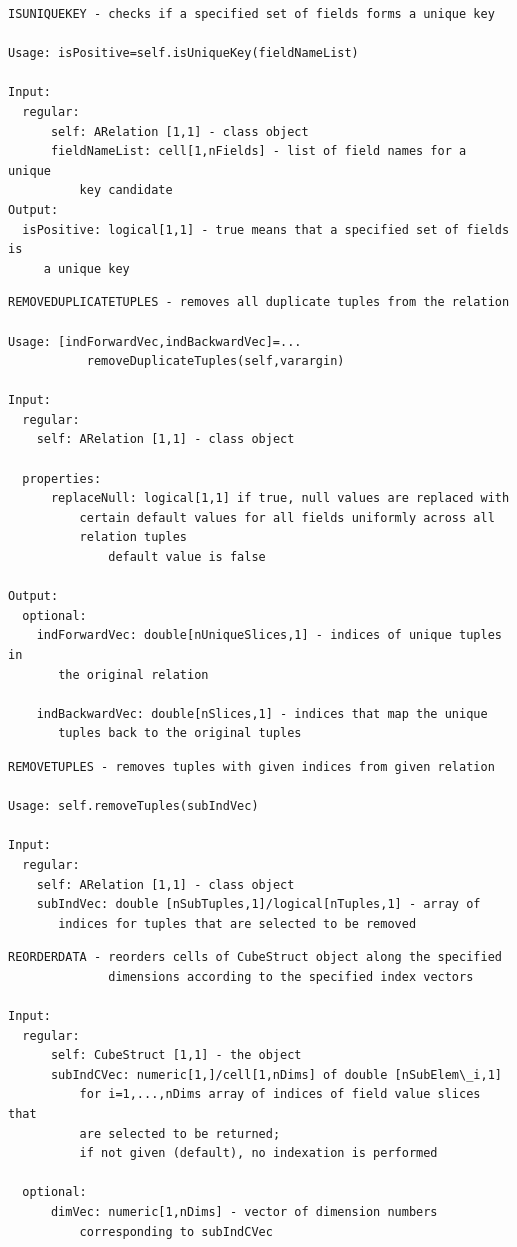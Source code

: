 \documentclass[letterpaper,10pt,english]{sphinxmanual}
\begin{document}
\begin{Verbatim}[commandchars=\\\{\}]
ISUNIQUEKEY - checks if a specified set of fields forms a unique key

Usage: isPositive=self.isUniqueKey(fieldNameList)

Input:
  regular:
      self: ARelation [1,1] - class object
      fieldNameList: cell[1,nFields] - list of field names for a unique
          key candidate
Output:
  isPositive: logical[1,1] - true means that a specified set of fields is
     a unique key
\end{Verbatim}
\label{chap_func:smartdb-relations-atypifiedstaticrelation-removeduplicatetuples}
\begin{Verbatim}[commandchars=\\\{\}]
REMOVEDUPLICATETUPLES - removes all duplicate tuples from the relation

Usage: [indForwardVec,indBackwardVec]=...
           removeDuplicateTuples(self,varargin)

Input:
  regular:
    self: ARelation [1,1] - class object

  properties:
      replaceNull: logical[1,1] if true, null values are replaced with
          certain default values for all fields uniformly across all
          relation tuples
              default value is false

Output:
  optional:
    indForwardVec: double[nUniqueSlices,1] - indices of unique tuples in
       the original relation

    indBackwardVec: double[nSlices,1] - indices that map the unique
       tuples back to the original tuples
\end{Verbatim}
\label{chap_func:smartdb-relations-atypifiedstaticrelation-removetuples}
\begin{Verbatim}[commandchars=\\\{\}]
REMOVETUPLES - removes tuples with given indices from given relation

Usage: self.removeTuples(subIndVec)

Input:
  regular:
    self: ARelation [1,1] - class object
    subIndVec: double [nSubTuples,1]/logical[nTuples,1] - array of
       indices for tuples that are selected to be removed
\end{Verbatim}
\label{chap_func:smartdb-relations-atypifiedstaticrelation-reorderdata}
\begin{Verbatim}[commandchars=\\\{\}]
REORDERDATA - reorders cells of CubeStruct object along the specified
              dimensions according to the specified index vectors

Input:
  regular:
      self: CubeStruct [1,1] - the object
      subIndCVec: numeric[1,]/cell[1,nDims] of double [nSubElem\_i,1]
          for i=1,...,nDims array of indices of field value slices that
          are selected to be returned;
          if not given (default), no indexation is performed

  optional:
      dimVec: numeric[1,nDims] - vector of dimension numbers
          corresponding to subIndCVec
\end{Verbatim}
\end{document}
